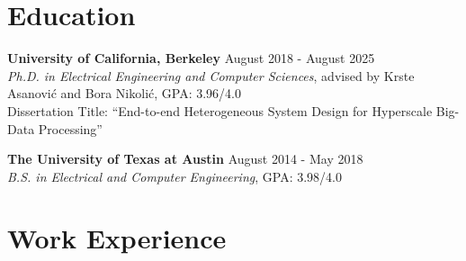 \documentclass[line]{res}
\begin{document}
\address{\href{https://abejgonzalez.github.io}{https://abejgonzalez.github.io} $|$ \href{mailto:abe.gonzalez@berkeley.edu}{abe.gonzalez@berkeley.edu}}

\begin{resume}

\vspace{-8mm}

\section{\Large{Education}}
\label{sec:education}
\vspace{1mm}

\textbf{University of California, Berkeley} \hfill August 2018 - August 2025
\\
\textit{Ph.D. in Electrical Engineering and Computer Sciences}, advised by Krste Asanovi\'c and Bora Nikoli\'c, GPA: 3.96/4.0
\\
Dissertation Title: ``End-to-end Heterogeneous System Design for Hyperscale Big-Data Processing''

\vspace{-3mm}

\textbf{The University of Texas at Austin} \hfill August 2014 - May 2018
\\
\textit{B.S. in Electrical and Computer Engineering}, GPA: 3.98/4.0

\vspace{-3mm}

\section{\Large{Work Experience}}
\label{sec:jobs}
\vspace{1mm}


\end{resume}
\end{document}
